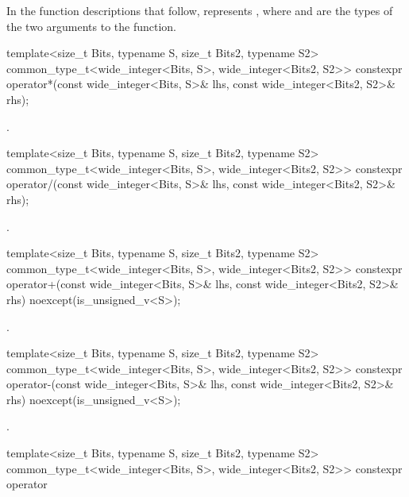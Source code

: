 In the function descriptions that follow,  represents , where  and  are the types of the two arguments to the function.

\begin{itemdecl}
template<size_t Bits, typename S, size_t Bits2, typename S2>
  common_type_t<wide_integer<Bits, S>, wide_integer<Bits2, S2>>
  constexpr operator*(const wide_integer<Bits, S>& lhs, const wide_integer<Bits2, S2>& rhs);
\end{itemdecl}

\begin{itemdescr}
\returns {}.
\end{itemdescr}

\begin{itemdecl}
template<size_t Bits, typename S, size_t Bits2, typename S2>
common_type_t<wide_integer<Bits, S>, wide_integer<Bits2, S2>>
  constexpr operator/(const wide_integer<Bits, S>& lhs, const wide_integer<Bits2, S2>& rhs);
\end{itemdecl}

\begin{itemdescr}
\returns {}.
\end{itemdescr}

\begin{itemdecl}
template<size_t Bits, typename S, size_t Bits2, typename S2>
common_type_t<wide_integer<Bits, S>, wide_integer<Bits2, S2>>
  constexpr operator+(const wide_integer<Bits, S>& lhs, const wide_integer<Bits2, S2>& rhs)
                      noexcept(is_unsigned_v<S>);
\end{itemdecl}

\begin{itemdescr}
\returns {}.
\end{itemdescr}

\begin{itemdecl}
template<size_t Bits, typename S, size_t Bits2, typename S2>
common_type_t<wide_integer<Bits, S>, wide_integer<Bits2, S2>>
  constexpr operator-(const wide_integer<Bits, S>& lhs, const wide_integer<Bits2, S2>& rhs)
                      noexcept(is_unsigned_v<S>);
\end{itemdecl}

\begin{itemdescr}
\returns {}.
\end{itemdescr}

\begin{itemdecl}
template<size_t Bits, typename S, size_t Bits2, typename S2>
common_type_t<wide_integer<Bits, S>, wide_integer<Bits2, S2>>
  constexpr operator%
\end{itemdecl}

